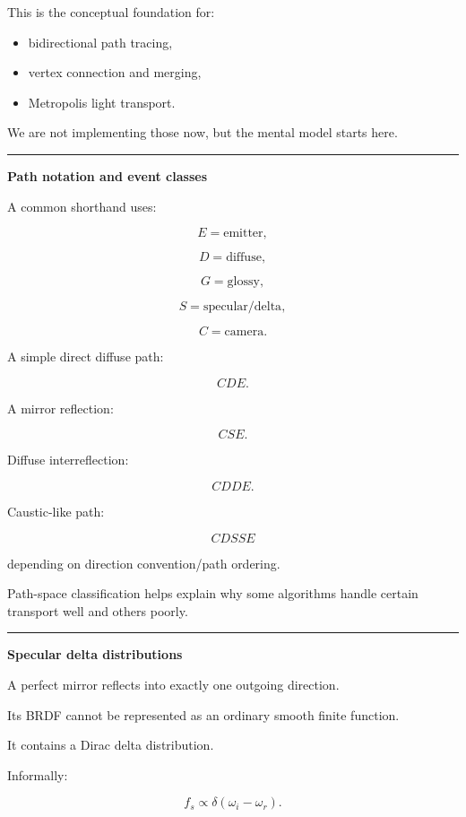 This is the conceptual foundation for:

\begin{itemize}
\tightlist
\item
  bidirectional path tracing,
\item
  vertex connection and merging,
\item
  Metropolis light transport.
\end{itemize}

We are not implementing those now, but the mental model starts here.

\begin{center}\rule{0.5\linewidth}{0.5pt}\end{center}

\textbf{Path notation and event classes}

A common shorthand uses:

\[
E=\text{emitter},
\]

\[
D=\text{diffuse},
\]

\[
G=\text{glossy},
\]

\[
S=\text{specular/delta},
\]

\[
C=\text{camera}.
\]

A simple direct diffuse path:

\[
CDE.
\]

A mirror reflection:

\[
CSE.
\]

Diffuse interreflection:

\[
CDDE.
\]

Caustic-like path:

\[
CDSSE
\]

depending on direction convention/path ordering.

Path-space classification helps explain why some algorithms handle certain transport well and others poorly.

\begin{center}\rule{0.5\linewidth}{0.5pt}\end{center}

\textbf{Specular delta distributions}

A perfect mirror reflects into exactly one outgoing direction.

Its BRDF cannot be represented as an ordinary smooth finite function.

It contains a Dirac delta distribution.

Informally:

\[
f_s
\propto
\delta(
\omega_i-\omega_r
).
\]

